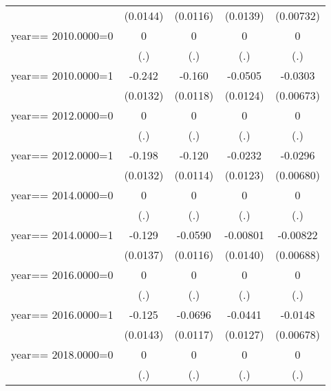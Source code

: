 \begin{table}[htbp]
\begin{tabular}{l*{4}{c}}
                & (0.0144)         & (0.0116)         & (0.0139)         &(0.00732)         \\
\addlinespace
year==  2010.0000=0&        0         &        0         &        0         &        0         \\
                &      (.)         &      (.)         &      (.)         &      (.)         \\
\addlinespace
year==  2010.0000=1&   -0.242\sym{***}&   -0.160\sym{***}&  -0.0505\sym{***}&  -0.0303\sym{***}\\
                & (0.0132)         & (0.0118)         & (0.0124)         &(0.00673)         \\
\addlinespace
year==  2012.0000=0&        0         &        0         &        0         &        0         \\
                &      (.)         &      (.)         &      (.)         &      (.)         \\
\addlinespace
year==  2012.0000=1&   -0.198\sym{***}&   -0.120\sym{***}&  -0.0232\sym{*}  &  -0.0296\sym{***}\\
                & (0.0132)         & (0.0114)         & (0.0123)         &(0.00680)         \\
\addlinespace
year==  2014.0000=0&        0         &        0         &        0         &        0         \\
                &      (.)         &      (.)         &      (.)         &      (.)         \\
\addlinespace
year==  2014.0000=1&   -0.129\sym{***}&  -0.0590\sym{***}& -0.00801         & -0.00822         \\
                & (0.0137)         & (0.0116)         & (0.0140)         &(0.00688)         \\
\addlinespace
year==  2016.0000=0&        0         &        0         &        0         &        0         \\
                &      (.)         &      (.)         &      (.)         &      (.)         \\
\addlinespace
year==  2016.0000=1&   -0.125\sym{***}&  -0.0696\sym{***}&  -0.0441\sym{***}&  -0.0148\sym{**} \\
                & (0.0143)         & (0.0117)         & (0.0127)         &(0.00678)         \\
\addlinespace
year==  2018.0000=0&        0         &        0         &        0         &        0         \\
                &      (.)         &      (.)         &      (.)         &      (.)         \\

\end{tabular}
\end{table}
